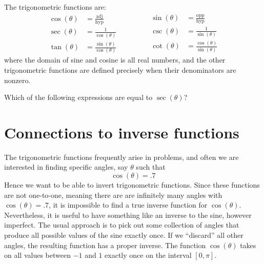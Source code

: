 \documentclass{ximera}
\begin{document}
\begin{definition}
  The trigonometric functions are:
  \[
  \begin{aligned}
  \cos(\theta) &= \frac{\text{adj}}{\text{hyp}}\\
  \sec(\theta) &= \frac{1}{\cos(\theta)}\\
  \tan(\theta) &= \frac{\sin(\theta)}{\cos(\theta)}\qquad
  \end{aligned}
  \qquad
  \begin{aligned}
  \sin(\theta) &= \frac{\text{opp}}{\text{hyp}}\\
  \csc(\theta) &= \frac{1}{\sin(\theta)}\\
  \cot(\theta) &= \frac{\cos(\theta)}{\sin(\theta)}    
  \end{aligned}
  \]
  where the domain of sine and cosine is all real numbers, and the
  other trigonometric functions are defined precisely when their
  denominators are nonzero.
\end{definition}

\begin{question}
  Which of the following expressions are equal to $\sec(\theta)$?
  \begin{selectAll}
    \choice[correct]{$\frac{\tan(\theta)}{\sin(\theta)}$}
  \end{selectAll}
\end{question}


  
\section{Connections to inverse functions}


The trigonometric functions frequently arise in problems, and often we
are interested in finding specific angles, say $\theta$ such that
\[
\cos(\theta) = .7
\]
Hence we want to be able to invert trigonometric functions. Since
these functions are not one-to-one, meaning there are are infinitely
many angles with $\cos(\theta) = .7$, it is impossible to find a true
inverse function for $\cos(\theta)$. Nevertheless, it is useful to
have something like an inverse to the sine, however imperfect. The
usual approach is to pick out some collection of angles that produce
all possible values of the sine exactly once. If we ``discard'' all
other angles, the resulting function has a proper inverse. The
function $\cos(\theta)$ takes on all values between $-1$ and $1$
exactly once on the interval $[0,\pi]$.
\end{document}
